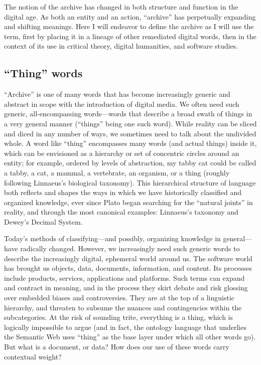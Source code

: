 The notion of the archive has changed in both structure and function in the digital age. As both an entity and an action, ``archive'' has perpetually expanding and shifting meanings. Here I will endeavor to define the archive as I will use the term, first by placing it in a lineage of other remediated digital words, then in the context of its use in critical theory, digital humanities, and software studies.

\subsection{``Thing'' words}

``Archive'' is one of many words that has become increasingly generic and abstract in scope with the introduction of digital media. We often need such generic, all-encompassing words---words that describe a broad swath of things in a very general manner (``things'' being one such word). While reality can be sliced and diced in any number of ways, we sometimes need to talk about the undivided whole. A word like ``thing'' encompasses many words (and actual things) inside it, which can be envisioned as a hierarchy or set of concentric circles around an entity; for example, ordered by levels of abstraction, my tabby cat could be called a tabby, a cat, a mammal, a vertebrate, an organism, or a thing (roughly following Linnaeus's biological taxonomy). This hierarchical structure of language both reflects and shapes the ways in which we have historically classified and organized knowledge, ever since Plato began searching for the ``natural joints'' in reality, and through the most canonical examples: Linnaeus's taxonomy and Dewey's Decimal System.

Today's methods of classifying---and possibly, organizing knowledge in general---have radically changed. However, we increasingly need such generic words to describe the increasingly digital, ephemeral world around us. The software world has brought us objects, data, documents, information, and content. Its processes include products, services, applications and platforms. Such terms can expand and contract in meaning, and in the process they skirt debate and risk glossing over embedded biases and controversies. They are at the top of a linguistic hierarchy, and threaten to subsume the nuances and contingencies within the subcategories. At the risk of sounding trite, everything is a thing, which is logically impossible to argue (and in fact, the ontology language that underlies the Semantic Web uses ``thing'' as the base layer under which all other words go). But what is a document, or data? How does our use of these words carry contextual weight?

